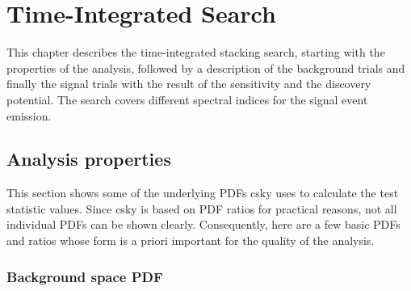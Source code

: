 \chapter{Time-Integrated Search} \label{sec:csky_time_int}

This chapter describes the time-integrated stacking search, starting with the properties of the analysis, followed by a description of the background trials and finally the signal trials with the result of the sensitivity and the discovery potential.
The search covers different spectral indices for the signal event emission.

\section{Analysis properties}

This section shows some of the underlying PDFs csky uses to calculate the test statistic values.
Since csky is based on PDF ratios for practical reasons, not all individual PDFs can be shown clearly.
Consequently, here are a few basic PDFs and ratios whose form is a priori important for the quality of the analysis.

\subsection{Background space PDF}

